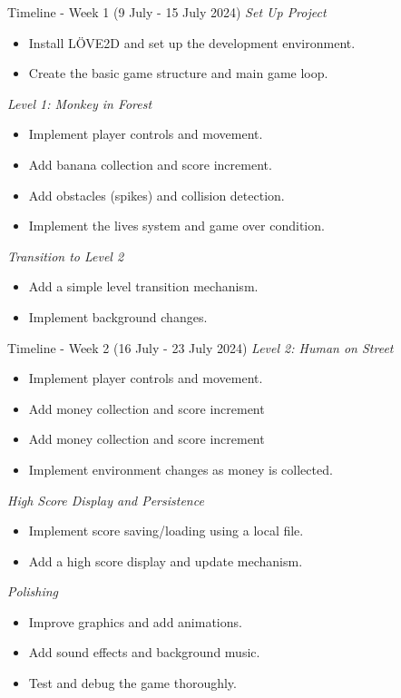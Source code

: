 \documentclass[pdf]{beamer}
\begin{document}
\begin{frame}{Timeline - Week 1 (9 July - 15 July 2024)}
    \LARGE\itshape Set Up Project
    \begin{itemize}
        \normalsize\upshape
        \item Install LÖVE2D and set up the development 
        environment.
        \item Create the basic game structure
         and main game loop.
    \end{itemize}

    \LARGE\itshape Level 1: Monkey in Forest
    \begin{itemize}
        \normalsize\upshape
        \item Implement player controls and movement.
        \item Add banana collection and score increment.
        \item Add obstacles (spikes) and collision detection.
        \item Implement the lives system and game over condition.
    \end{itemize}

    \LARGE\itshape Transition to Level 2
    \begin{itemize}
        \normalsize\upshape
        \item Add a simple level transition mechanism.
        \item Implement background changes.
    \end{itemize}
\end{frame}
    
\begin{frame}{Timeline - Week 2 (16 July - 23 July 2024)}
    \LARGE\itshape Level 2: Human on Street
    \begin{itemize}
        \normalsize\upshape
        \item Implement player controls and movement.
        \item Add money collection and score increment
        \item Add money collection and score increment
        \item Implement environment changes as money is collected.
    \end{itemize}  

    \LARGE\itshape High Score Display and Persistence
    \begin{itemize}
        \normalsize\upshape
        \item Implement score saving/loading using a local file.
        \item Add a high score display and update mechanism.
    \end{itemize} 
    
    \LARGE\itshape Polishing
    \begin{itemize}
        \normalsize\upshape
        \item Improve graphics and add animations.
        \item Add sound effects and background music.
        \item Test and debug the game thoroughly.
    \end{itemize} 
\end{frame}
\end{document}

